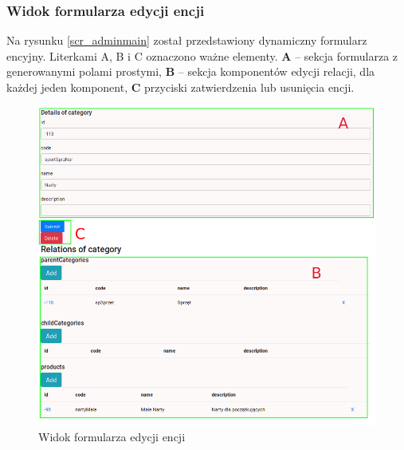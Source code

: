 \subsubsection{Widok formularza edycji encji}
Na rysunku \ref{scr_adminmain} został przedstawiony dynamiczny formularz encyjny. Literkami A, B i C oznaczono ważne elementy. \textbf{A} -- sekcja formularza z generowanymi polami prostymi, \textbf{B} -- sekcja komponentów edycji relacji, dla każdej jeden komponent, \textbf{C} przyciski zatwierdzenia lub usunięcia encji. 
\begin{figure}
	\begin{center}
		\includegraphics[width=1\textwidth]{admin-dfe.png}
	\end{center}
	\caption{{\color{black}Widok formularza edycji encji}} \label{scr_admindfe}
\end{figure}

